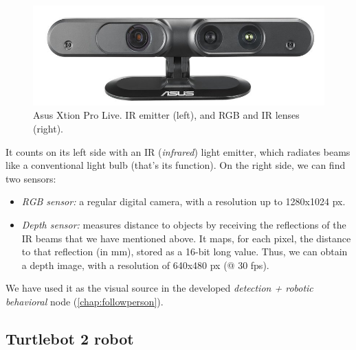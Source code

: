 		\begin{figure}[h]
			\centering
			\includegraphics[width=0.4\linewidth]{images/xtion}
			\caption{Asus Xtion Pro Live. IR emitter (left), and RGB and IR lenses (right).}
			\label{fig:3_xtion}
		\end{figure}

		It counts on its left side with an IR (\emph{infrared}) light emitter, which radiates beams like a conventional light bulb (that's its function). On the right side, we can find two sensors:
		\begin{itemize}
			\item \emph{RGB sensor:} a regular digital camera, with a resolution up to 1280x1024 px.
			
			\item \emph{Depth sensor:} measures distance to objects by receiving the reflections of the IR beams that we have mentioned above. It maps, for each pixel, the distance to that reflection (in mm), stored as a 16-bit long value. Thus, we can obtain a depth image, with a resolution of 640x480 px (@ 30 fps).
		\end{itemize}

	We have used it as the visual source in the developed \emph{detection + robotic behavioral} node (\autoref{chap:followperson}).\\
		
	
	\subsection{Turtlebot 2 robot}

